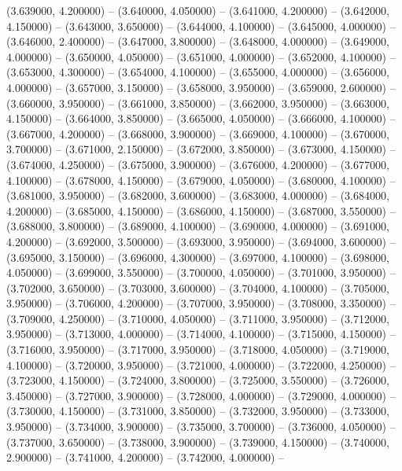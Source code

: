 (3.639000, 4.200000) -- 
(3.640000, 4.050000) -- 
(3.641000, 4.200000) -- 
(3.642000, 4.150000) -- 
(3.643000, 3.650000) -- 
(3.644000, 4.100000) -- 
(3.645000, 4.000000) -- 
(3.646000, 2.400000) -- 
(3.647000, 3.800000) -- 
(3.648000, 4.000000) -- 
(3.649000, 4.000000) -- 
(3.650000, 4.050000) -- 
(3.651000, 4.000000) -- 
(3.652000, 4.100000) -- 
(3.653000, 4.300000) -- 
(3.654000, 4.100000) -- 
(3.655000, 4.000000) -- 
(3.656000, 4.000000) -- 
(3.657000, 3.150000) -- 
(3.658000, 3.950000) -- 
(3.659000, 2.600000) -- 
(3.660000, 3.950000) -- 
(3.661000, 3.850000) -- 
(3.662000, 3.950000) -- 
(3.663000, 4.150000) -- 
(3.664000, 3.850000) -- 
(3.665000, 4.050000) -- 
(3.666000, 4.100000) -- 
(3.667000, 4.200000) -- 
(3.668000, 3.900000) -- 
(3.669000, 4.100000) -- 
(3.670000, 3.700000) -- 
(3.671000, 2.150000) -- 
(3.672000, 3.850000) -- 
(3.673000, 4.150000) -- 
(3.674000, 4.250000) -- 
(3.675000, 3.900000) -- 
(3.676000, 4.200000) -- 
(3.677000, 4.100000) -- 
(3.678000, 4.150000) -- 
(3.679000, 4.050000) -- 
(3.680000, 4.100000) -- 
(3.681000, 3.950000) -- 
(3.682000, 3.600000) -- 
(3.683000, 4.000000) -- 
(3.684000, 4.200000) -- 
(3.685000, 4.150000) -- 
(3.686000, 4.150000) -- 
(3.687000, 3.550000) -- 
(3.688000, 3.800000) -- 
(3.689000, 4.100000) -- 
(3.690000, 4.000000) -- 
(3.691000, 4.200000) -- 
(3.692000, 3.500000) -- 
(3.693000, 3.950000) -- 
(3.694000, 3.600000) -- 
(3.695000, 3.150000) -- 
(3.696000, 4.300000) -- 
(3.697000, 4.100000) -- 
(3.698000, 4.050000) -- 
(3.699000, 3.550000) -- 
(3.700000, 4.050000) -- 
(3.701000, 3.950000) -- 
(3.702000, 3.650000) -- 
(3.703000, 3.600000) -- 
(3.704000, 4.100000) -- 
(3.705000, 3.950000) -- 
(3.706000, 4.200000) -- 
(3.707000, 3.950000) -- 
(3.708000, 3.350000) -- 
(3.709000, 4.250000) -- 
(3.710000, 4.050000) -- 
(3.711000, 3.950000) -- 
(3.712000, 3.950000) -- 
(3.713000, 4.000000) -- 
(3.714000, 4.100000) -- 
(3.715000, 4.150000) -- 
(3.716000, 3.950000) -- 
(3.717000, 3.950000) -- 
(3.718000, 4.050000) -- 
(3.719000, 4.100000) -- 
(3.720000, 3.950000) -- 
(3.721000, 4.000000) -- 
(3.722000, 4.250000) -- 
(3.723000, 4.150000) -- 
(3.724000, 3.800000) -- 
(3.725000, 3.550000) -- 
(3.726000, 3.450000) -- 
(3.727000, 3.900000) -- 
(3.728000, 4.000000) -- 
(3.729000, 4.000000) -- 
(3.730000, 4.150000) -- 
(3.731000, 3.850000) -- 
(3.732000, 3.950000) -- 
(3.733000, 3.950000) -- 
(3.734000, 3.900000) -- 
(3.735000, 3.700000) -- 
(3.736000, 4.050000) -- 
(3.737000, 3.650000) -- 
(3.738000, 3.900000) -- 
(3.739000, 4.150000) -- 
(3.740000, 2.900000) -- 
(3.741000, 4.200000) -- 
(3.742000, 4.000000) -- 
